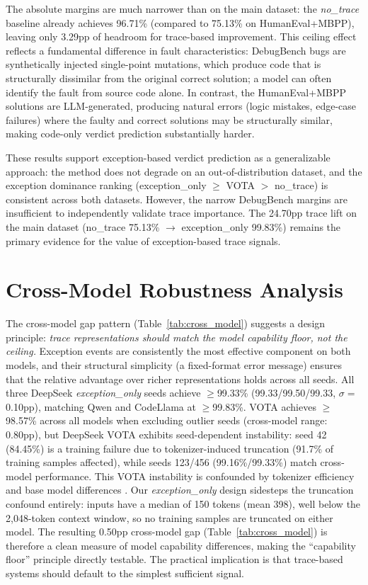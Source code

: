 The absolute margins are much narrower than on the main dataset: the \textit{no\_trace} baseline already achieves 96.71\% (compared to 75.13\% on HumanEval+MBPP), leaving only 3.29pp of headroom for trace-based improvement.
This ceiling effect reflects a fundamental difference in fault characteristics: DebugBench bugs are synthetically injected single-point mutations, which produce code that is structurally dissimilar from the original correct solution; a model can often identify the fault from source code alone.
In contrast, the HumanEval+MBPP solutions are LLM-generated, producing natural errors (logic mistakes, edge-case failures) where the faulty and correct solutions may be structurally similar, making code-only verdict prediction substantially harder.

These results support exception-based verdict prediction as a generalizable approach: the method does not degrade on an out-of-distribution dataset, and the exception dominance ranking (exception\_only $\geq$ VOTA $>$ no\_trace) is consistent across both datasets. However, the narrow DebugBench margins are insufficient to independently validate trace importance.
The 24.70pp trace lift on the main dataset (no\_trace 75.13\% $\to$ exception\_only 99.83\%) remains the primary evidence for the value of exception-based trace signals.

\section{Cross-Model Robustness Analysis}
\label{sec:robustness_analysis}

The cross-model gap pattern (Table~\ref{tab:cross_model}) suggests a design principle: \emph{trace representations should match the model capability floor, not the ceiling.}
Exception events are consistently the most effective component on both models, and their structural simplicity (a fixed-format error message) ensures that the relative advantage over richer representations holds across all seeds.
All three DeepSeek \textit{exception\_only} seeds achieve ${\geq}$99.33\% (99.33/99.50/99.33, $\sigma{=}$0.10pp), matching Qwen and CodeLlama at ${\geq}$99.83\%.
VOTA achieves ${\geq}$98.57\% across all models when excluding outlier seeds (cross-model range: 0.80pp), but DeepSeek VOTA exhibits seed-dependent instability: seed 42 (84.45\%) is a training failure due to tokenizer-induced truncation (91.7\% of training samples affected), while seeds 123/456 (99.16\%/99.33\%) match cross-model performance.
This VOTA instability is confounded by tokenizer efficiency and base model differences \citep{yang2024generalization}.
Our \textit{exception\_only} design sidesteps the truncation confound entirely: inputs have a median of 150 tokens (mean 398), well below the 2{,}048-token context window, so no training samples are truncated on either model.
The resulting 0.50pp cross-model gap (Table~\ref{tab:cross_model}) is therefore a clean measure of model capability differences, making the ``capability floor'' principle directly testable.
The practical implication is that trace-based systems should default to the simplest sufficient signal.

